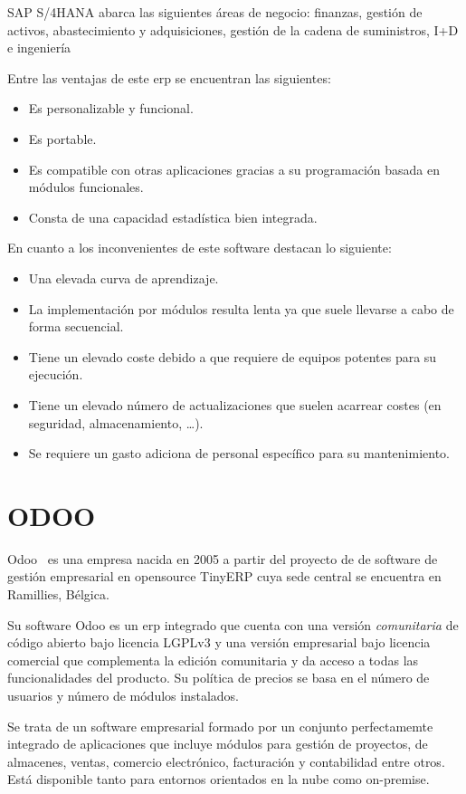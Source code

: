 SAP S/4HANA abarca las siguientes áreas de negocio: finanzas, gestión de activos, abastecimiento y adquisiciones, gestión de la cadena de suministros, I+D e ingeniería 


Entre las ventajas de este \acrshort{erp} se encuentran las siguientes:
\begin{itemize}
\item Es personalizable y funcional.
\item Es portable.
\item Es compatible con otras aplicaciones gracias a su programación basada en módulos funcionales.
\item Consta de una capacidad estadística bien integrada.
\end{itemize}


En cuanto a los inconvenientes de este software destacan lo siguiente:

\begin{itemize}
\item Una elevada curva de aprendizaje.
\item La implementación por módulos resulta lenta ya que suele llevarse a cabo de forma secuencial.
\item Tiene un elevado coste debido a que requiere de equipos potentes para su ejecución.
\item Tiene un elevado número de actualizaciones que suelen acarrear costes (en seguridad, almacenamiento, \dots).
\item Se requiere un gasto adiciona de personal específico para su mantenimiento.
\end{itemize}


\section{ODOO}
\label{sec:estado-arte-odoo}

Odoo~\cite{Odoo} es una empresa nacida en 2005 a partir del proyecto de de software de gestión empresarial en \gls{opensource} TinyERP cuya sede central se encuentra en Ramillies, Bélgica.

Su software Odoo es un \acrshort{erp} integrado que cuenta con una versión \textit{comunitaria} de código abierto bajo licencia LGPLv3 y una versión empresarial bajo licencia comercial que complementa la edición comunitaria y da acceso a todas las funcionalidades del producto. Su política de precios se basa en el número de usuarios y número de módulos instalados.

Se trata de un software empresarial formado por un conjunto perfectamemte integrado de aplicaciones que incluye módulos para gestión de proyectos, de almacenes, ventas, comercio electrónico, facturación y contabilidad entre otros. Está disponible tanto para entornos orientados en la nube como on-premise.


